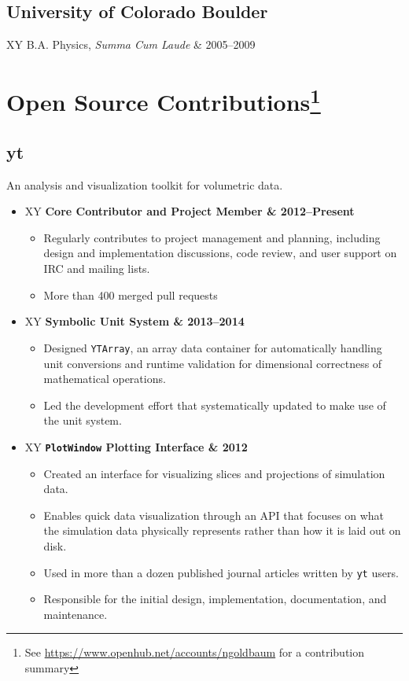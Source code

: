 \documentclass[10pt,letterpaper]{article}
\newcommand{\textline}[2]{
  \begin{tabularx}{\textwidth}{XY}
  #1 & #2
  \end{tabularx}
}
\begin{document}
\subsection*{University of Colorado Boulder}
\begin{itemize}
  \textline{B.A. Physics, \textit{Summa Cum Laude}}{2005--2009}
\end{itemize}


\section*{Open Source Contributions\footnote{See
    \href{https://www.openhub.net/accounts/ngoldbaum}{https://www.openhub.net/accounts/ngoldbaum}
    for a contribution summary}}

\subsection*{yt}
An analysis and visualization toolkit for volumetric data.

\begin{itemize}

\item[] \textline{\bf Core Contributor and Project Member}{2012--Present}
  \begin{itemize}
    \item Regularly contributes to project management and planning, including
      design and implementation discussions, code review, and user support on
      IRC and mailing lists.
    \item More than 400 merged pull requests
  \end{itemize}

\item[] \textline{\bf Symbolic Unit System}{2013--2014}
  \begin{itemize}
    \item Designed \texttt{YTArray}, an array data container for automatically
      handling unit conversions and runtime validation for dimensional correctness
      of mathematical operations.
    \item Led the development effort that systematically updated  to
      make use of the unit system.
  \end{itemize}

\item[] \textline{\bf \texttt{PlotWindow} Plotting Interface}{2012}
  \begin{itemize}
    \item Created an interface for visualizing slices and projections of
      simulation data.
    \item Enables quick data visualization through an API that focuses on what
      the simulation data physically represents rather than how it is laid out
      on disk.
    \item Used in more than a dozen published journal articles written by
      \texttt{yt} users.
    \item Responsible for the initial design, implementation, documentation, and maintenance.
  \end{itemize}

\end{itemize}
\end{document}
